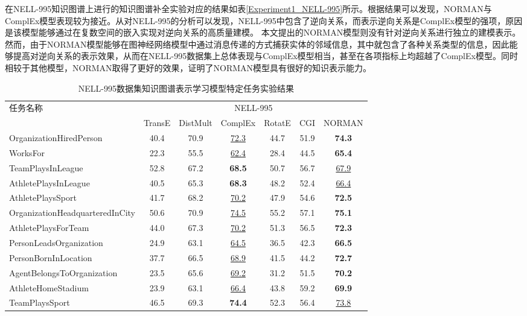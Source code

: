 \documentclass[algorithmlist, AutoFakeBold, AutoFakeSlant, figurelist, tablelist, nomlist, engineering, openany]{seuthesix} %
\begin{document}
在NELL-995知识图谱上进行的知识图谱补全实验对应的结果如表\ref{Experiment1_NELL-995}所示。根据结果可以发现，NORMAN与ComplEx模型表现较为接近。从对NELL-995的分析可以发现，NELL-995中包含了逆向关系，而表示逆向关系是ComplEx模型的强项，原因是该模型能够通过在复数空间的嵌入实现对逆向关系的高质量建模。
本文提出的NORMAN模型则没有针对逆向关系进行独立的建模表示。然而，由于NORMAN模型能够在图神经网络模型中通过消息传递的方式捕获实体的邻域信息，其中就包含了各种关系类型的信息，因此能够提高对逆向关系的表示效果，从而在NELL-995数据集上总体表现与ComplEx模型相当，甚至在各项指标上均超越了ComplEx模型。同时相较于其他模型，NORMAN取得了更好的效果，证明了NORMAN模型具有很好的知识表示能力。

\begin{table}[t]
  \centering
  \caption{NELL-995数据集知识图谱表示学习模型特定任务实验结果}
  \begin{tabular*}{0.95\textwidth}{@{\extracolsep{\fill}}lcccccc}
    \toprule[1pt]
    \multirow{2}{*}{\small{任务名称}} & \multicolumn{6}{c}{\small{NELL-995}} \\
      & \small{TransE} & \small{DistMult} & \small{ComplEx} & \small{RotatE} & \small{CGI} & \small{NORMAN} \\ \hline
    \small{OrganizationHiredPerson} & 40.4 & 70.9 & \underline{72.3} & 44.7 & 51.9 & \textbf{74.3} \\
    \small{WorksFor} & 22.3 & 55.5 & \underline{62.4} & 28.4 & 44.5 & \textbf{65.4} \\
    \small{TeamPlaysInLeague} & 52.8 & 67.2 & \textbf{68.5} & 50.7 & 56.7 & \underline{67.9} \\
    \small{AthletePlaysInLeague} & 40.5 & 65.3 & \textbf{68.3} & 48.2 & 52.4 & \underline{66.4} \\
    \small{AthletePlaysSport} & 41.7 & 68.2 & \underline{70.2} & 47.9 & 54.6 & \textbf{72.5} \\
    \small{OrganizationHeadquarteredInCity} & 50.6 & 70.9 & \underline{74.5} & 55.2 & 57.1 & \textbf{75.1} \\
    \small{AthletePlaysForTeam} & 44.0 & 67.3 & \underline{70.2} & 51.3 & 56.5 & \textbf{72.3} \\
    \small{PersonLeadsOrganization} & 24.9 & 63.1 & \underline{64.5} & 36.5 & 42.3 & \textbf{66.5} \\
    \small{PersonBornInLocation} & 37.7 & 66.5 & \underline{68.9} & 41.5 & 44.2 & \textbf{72.7} \\
    \small{AgentBelongsToOrganization} & 23.5 & 65.6 & \underline{69.2} & 31.2 & 51.5 & \textbf{70.2} \\
    \small{AthleteHomeStadium} & 23.9 & 63.1 & \underline{66.4} & 43.8 & 59.2 & \textbf{69.9} \\
    \small{TeamPlaysSport} & 46.5 & 69.3 & \textbf{74.4} & 52.3 & 56.4 & \underline{73.8} \\
    \bottomrule[1pt]
  \end{tabular*}
  \label{Experiment1_tasks1}
\end{table}
\end{document}
